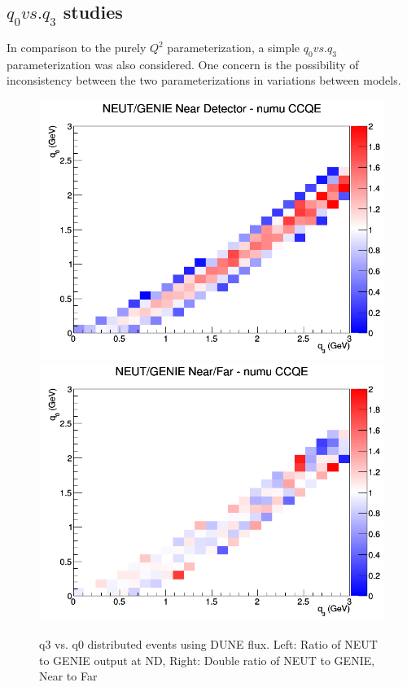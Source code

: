 \documentclass[12pt]{article}
\begin{document}
\subsection{$q_0 vs. q_3$ studies}

In comparison to the purely $Q^2$ parameterization, a simple $q_0 vs. q_3$ parameterization was also considered. One concern is the possibility of inconsistency between the two parameterizations in variations between models. 
\begin{figure}[h]
\includegraphics[width=\linewidth]{q0_q3/nominal/ratios/CCQE_NEUT_GENIE_numu_near_q3_q0.png}
\endminipage
{}
\includegraphics[width=\linewidth]{q0_q3/nominal/ratios/CCQE_NEUT_GENIE_numu_NF_q3_q0.png}
\endminipage
\caption{q3 vs. q0 distributed events using DUNE flux. Left: Ratio of NEUT to GENIE output at ND, Right: Double ratio of NEUT to GENIE, Near to Far}
\end{figure}
\end{document}
